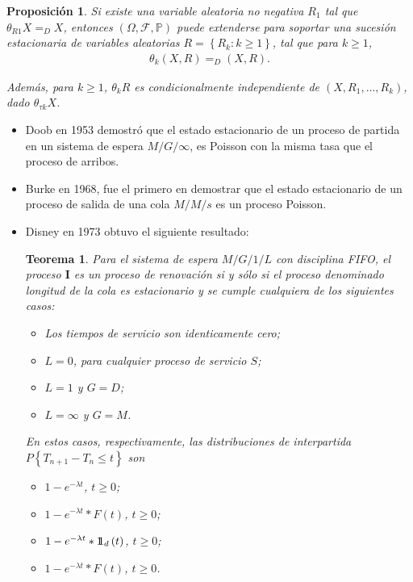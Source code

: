 \documentclass{article}
\newtheorem{Teo}{Teorema}
\newtheorem{Prop}{Proposición}
\newcommand{\prob}{\mathbb{P}}
\newcommand{\indora}{\mbox{$1$\hspace{-0.8ex}$1$}}
\begin{document}
\begin{Prop}
Si existe una variable aleatoria no negativa $R_{1}$ tal que $\theta_{R1}X=_{D}X$, entonces $\left(\Omega,\mathcal{F},\prob\right)$ puede extenderse para soportar una sucesi\'on estacionaria de variables aleatorias $R=\left\{R_{k}:k\geq1\right\}$, tal que para $k\geq1$,
\begin{eqnarray*}
\theta_{k}\left(X,R\right)=_{D}\left(X,R\right).
\end{eqnarray*}

Adem\'as, para $k\geq1$, $\theta_{k}R$ es condicionalmente independiente de $\left(X,R_{1},\ldots,R_{k}\right)$, dado $\theta_{\tau k}X$.

\end{Prop}


\begin{itemize}
\item Doob en 1953 demostr\'o que el estado estacionario de un proceso de partida en un sistema de espera $M/G/\infty$, es Poisson con la misma tasa que el proceso de arribos.

\item Burke en 1968, fue el primero en demostrar que el estado estacionario de un proceso de salida de una cola $M/M/s$ es un proceso Poisson.

\item Disney en 1973 obtuvo el siguiente resultado:

\begin{Teo}
Para el sistema de espera $M/G/1/L$ con disciplina FIFO, el proceso $\textbf{I}$ es un proceso de renovaci\'on si y s\'olo si el proceso denominado longitud de la cola es estacionario y se cumple cualquiera de los siguientes casos:

\begin{itemize}
\item[a)] Los tiempos de servicio son identicamente cero;
\item[b)] $L=0$, para cualquier proceso de servicio $S$;
\item[c)] $L=1$ y $G=D$;
\item[d)] $L=\infty$ y $G=M$.
\end{itemize}
En estos casos, respectivamente, las distribuciones de interpartida $P\left\{T_{n+1}-T_{n}\leq t\right\}$ son


\begin{itemize}
\item[a)] $1-e^{-\lambda t}$, $t\geq0$;
\item[b)] $1-e^{-\lambda t}*F\left(t\right)$, $t\geq0$;
\item[c)] $1-e^{-\lambda t}*\indora_{d}\left(t\right)$, $t\geq0$;
\item[d)] $1-e^{-\lambda t}*F\left(t\right)$, $t\geq0$.
\end{itemize}
\end{Teo}



\end{itemize}
\end{document}
